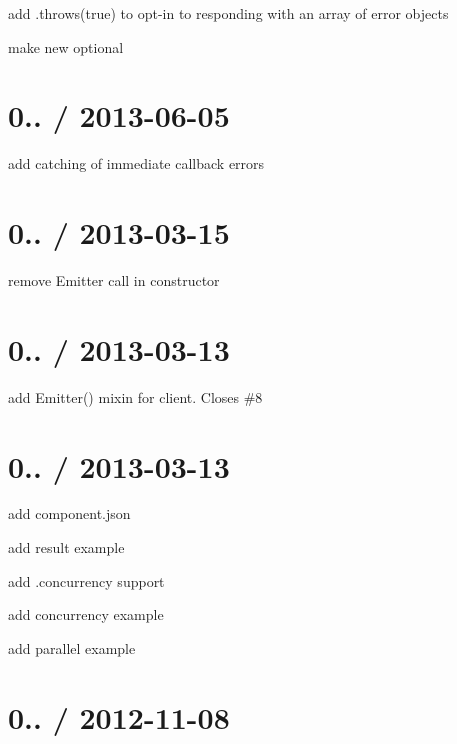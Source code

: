 \begin{DoxyItemize}
\item add {\ttfamily .throws(true)} to opt-\/in to responding with an array of error objects
\item make {\ttfamily new} optional
\end{DoxyItemize}

\section*{0.. / 2013-\/06-\/05 }


\begin{DoxyItemize}
\item add catching of immediate callback errors
\end{DoxyItemize}

\section*{0.. / 2013-\/03-\/15 }


\begin{DoxyItemize}
\item remove Emitter call in constructor
\end{DoxyItemize}

\section*{0.. / 2013-\/03-\/13 }


\begin{DoxyItemize}
\item add Emitter() mixin for client. Closes \#8
\end{DoxyItemize}

\section*{0.. / 2013-\/03-\/13 }


\begin{DoxyItemize}
\item add component.\+json
\item add result example
\item add .concurrency support
\item add concurrency example
\item add parallel example
\end{DoxyItemize}

\section*{0.. / 2012-\/11-\/08 }


